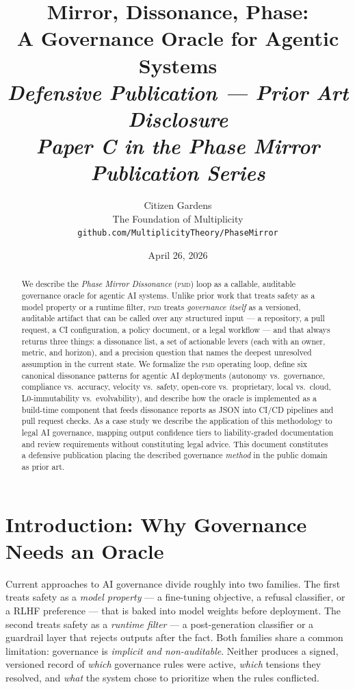 \documentclass[11pt,letterpaper]{article}
\title{%
  \textbf{Mirror, Dissonance, Phase:}\\[4pt]
  \large A Governance Oracle for Agentic Systems\\[8pt]
  \normalsize\textit{Defensive Publication --- Prior Art Disclosure}\\
  \normalsize\textit{Paper C in the Phase Mirror Publication Series}
}
\author{%
  Citizen Gardens\\
  \small The Foundation of Multiplicity\\
  \small \texttt{github.com/MultiplicityTheory/PhaseMirror}
}
\date{April 26, 2026}
\theoremstyle{remark}
\newcommand{\pmd}{\textsc{pmd}}
\begin{document}
\maketitle\thispagestyle{fancy}

\begin{abstract}
We describe the \emph{Phase Mirror Dissonance} (\pmd{}) loop as a callable,
auditable governance oracle for agentic AI systems.  Unlike prior work that
treats safety as a model property or a runtime filter, \pmd{} treats
\emph{governance itself} as a versioned, auditable artifact that can be
called over any structured input --- a repository, a pull request, a CI
configuration, a policy document, or a legal workflow --- and that always
returns three things: a dissonance list, a set of actionable levers
(each with an owner, metric, and horizon), and a precision question that
names the deepest unresolved assumption in the current state.  We formalize
the \pmd{} operating loop, define six canonical dissonance patterns for
agentic AI deployments (autonomy vs.\ governance, compliance vs.\ accuracy,
velocity vs.\ safety, open-core vs.\ proprietary, local vs.\ cloud,
L0-immutability vs.\ evolvability), and describe how the oracle is
implemented as a build-time component that feeds dissonance reports as
JSON into CI/CD pipelines and pull request checks.  As a case study we
describe the application of this methodology to legal AI governance,
mapping output confidence tiers to liability-graded documentation and
review requirements without constituting legal advice.  This document
constitutes a defensive publication placing the described governance
\emph{method} in the public domain as prior art.
\end{abstract}

\tableofcontents\newpage

\section{Introduction: Why Governance Needs an Oracle}

Current approaches to AI governance divide roughly into two families.  The
first treats safety as a \emph{model property} --- a fine-tuning objective,
a refusal classifier, or a RLHF preference --- that is baked into model
weights before deployment.  The second treats safety as a \emph{runtime
filter} --- a post-generation classifier or a guardrail layer that rejects
outputs after the fact.  Both families share a common limitation: governance
is \emph{implicit and non-auditable}.  Neither produces a signed, versioned
record of \emph{which} governance rules were active, \emph{which} tensions
they resolved, and \emph{what} the system chose to prioritize when the rules
conflicted.
\end{document}
